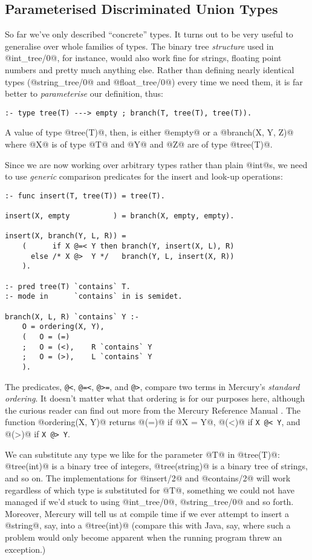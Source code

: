 
\subsection{Parameterised Discriminated Union Types}

So far we've only described ``concrete'' types.  It turns out to be very
useful to generalise over whole families of types.  The binary
tree \emph{structure} used in @int_tree/0@, for instance, would also work
fine for strings, floating
point numbers and pretty much anything else.  Rather than defining
nearly identical types (\eg @string_tree/0@ and @float_tree/0@) every time
we need them, it is far better to \emph{parameterise} our definition, thus:
\begin{verbatim}
:- type tree(T) ---> empty ; branch(T, tree(T), tree(T)).
\end{verbatim}
A value of type @tree(T)@, then, is either @empty@ or a @branch(X, Y, Z)@
where @X@ is of type @T@ and @Y@ and @Z@ are of type @tree(T)@.

Since we are now working over arbitrary types rather than plain @int@s, we
need to use \emph{generic} comparison predicates for the insert and look-up
operations:
\begin{verbatim}
:- func insert(T, tree(T)) = tree(T).

insert(X, empty          ) = branch(X, empty, empty).

insert(X, branch(Y, L, R)) =
    (      if X @=< Y then branch(Y, insert(X, L), R)
      else /* X @>  Y */   branch(Y, L, insert(X, R))
    ).

:- pred tree(T) `contains` T.
:- mode in      `contains` in is semidet.

branch(X, L, R) `contains` Y :-
    O = ordering(X, Y),
    (   O = (=)
    ;   O = (<),    R `contains` Y
    ;   O = (>),    L `contains` Y
    ).
\end{verbatim}
The predicates, \verb!@<!, \verb!@=<!, \verb!@>=!, and \verb!@>!, 
compare two terms in Mercury's \emph{standard ordering}.
It doesn't matter what that ordering is for our purposes here, although the
curious reader can find out more from the Mercury Reference Manual
.
The function
@ordering(X, Y)@ returns @(=)@ if @X = Y@, @(<)@ if \verb!X @< Y!, and
@(>)@ if \verb!X @> Y!.

We can substitute any type we like for the parameter @T@ in @tree(T)@:
@tree(int)@ is a binary tree of integers, @tree(string)@ is a binary tree of
strings, and so on.  The implementations for @insert/2@ and @contains/2@
will work regardless of which type is substituted for @T@, something we
could not have managed if we'd stuck to using @int_tree/0@, @string_tree/0@
and so forth.
Moreover, Mercury will tell us at compile time if we ever attempt to insert
a @string@, say, into a @tree(int)@ (compare this with Java, say, where such
a problem would only become apparent when the running program threw an
exception.)

